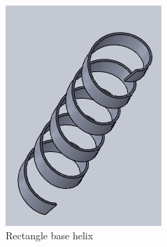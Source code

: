 \documentclass[12pt,a4paper,titlepage]{report}
\begin{document}
\begin{figure}
\begin{subfigure}[b]{0.25\textwidth}
        \end{subfigure}~
  \begin{subfigure}[b]{0.36\textwidth}
                \includegraphics[width=\textwidth]{Design2}
                \caption{Rectangle base helix}
                \label{Design2}
        \end{subfigure}~
  \begin{subfigure}[b]{0.32\textwidth}

\end{subfigure}
\end{figure}
\end{document}
